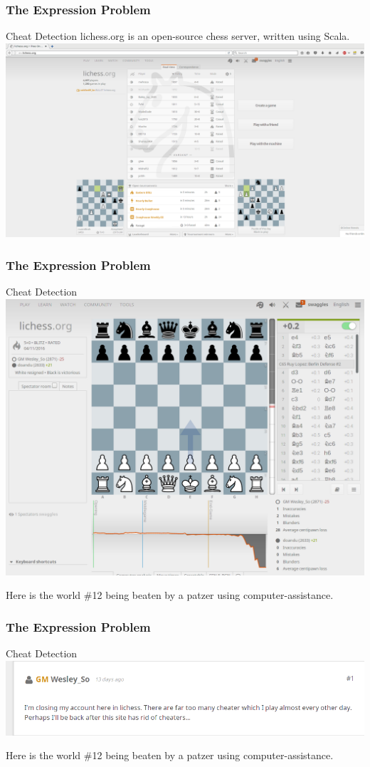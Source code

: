 \begin{frame}[fragile]
\frametitle{The Expression Problem}
\begin{block}{Cheat Detection}
lichess.org is an open-source chess server, written using Scala.
\includegraphics[height=0.4\textheight,natwidth=1867,natheight=1011]{image/lichess.png}
\end{block}
\end{frame}

\begin{frame}[fragile]
\frametitle{The Expression Problem}
\begin{block}{Cheat Detection}
\includegraphics[height=0.5\textheight,natwidth=1140,natheight=878]{image/lichess-wesley-so.png}
\par
Here is the world \#12 being beaten by a patzer using computer-assistance.
\end{block}
\end{frame}

\begin{frame}[fragile]
\frametitle{The Expression Problem}
\begin{block}{Cheat Detection}
\includegraphics[height=0.2\textheight,natwidth=883,natheight=184]{image/lichess-wesley-so-announce.png}
\par
Here is the world \#12 being beaten by a patzer using computer-assistance.
\end{block}
\end{frame}
